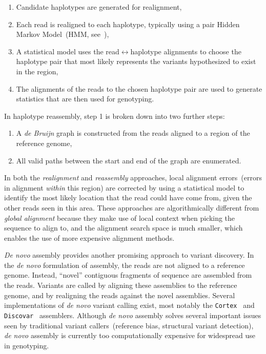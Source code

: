 \documentclass[masters]{ucbthesis}
\begin{document}
\begin{enumerate}
\item Candidate haplotypes are generated for realignment,
\item Each read is realigned to each haplotype, typically using a pair Hidden Markov Model~(HMM,
see~\cite{durbin98}),
\item A statistical model uses the read$\leftrightarrow$haplotype alignments to choose the haplotype pair
that most likely represents the variants hypothesized to exist in the region, 
\item The alignments of the reads to the chosen haplotype pair are used to generate statistics that are
then used for genotyping.
\end{enumerate}

In haplotype reassembly, step 1 is broken down into two further steps:

\begin{enumerate}
\item A \emph{de Bruijn} graph is constructed from the reads aligned to a region of the reference genome,
\item All valid paths between the start and end of the graph are enumerated.
\end{enumerate}

In both the \emph{realignment} and \emph{reassembly} approaches, local alignment errors~(errors in
alignment \emph{within} this region) are corrected by using a statistical model to identify the most likely
location that the read could have come from, given the other reads seen in this area. These approaches
are algorithmically different from \emph{global alignment} because they make use of local context when
picking the sequence to align to, and the alignment search space is much smaller, which enables the use
of more expensive alignment methods.

\emph{De novo} assembly provides another promising approach to variant discovery. In the \emph{de
novo} formulation of assembly, the reads are not aligned to a reference genome. Instead, ``novel''
contiguous fragments of sequence are assembled from the reads. Variants are called by aligning these
assemblies to the reference genome, and by realigning the reads against the novel assemblies. Several
implementations of \emph{de novo} variant calling exist, most notably the \texttt{Cortex}~\cite{iqbal12}
and \texttt{Discovar}~\cite{weisenfeld14} assemblers. Although \emph{de novo} assembly solves
several important issues seen by traditional variant callers~(reference bias, structural variant detection),
\emph{de novo} assembly is currently too computationally expensive for widespread use in genotyping.
\end{document}
